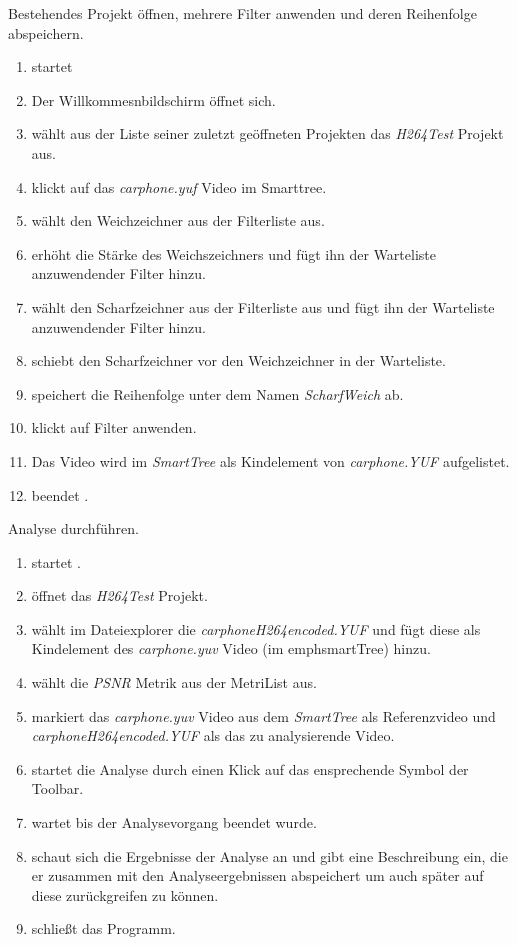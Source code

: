  Bestehendes Projekt öffnen, mehrere Filter anwenden und deren Reihenfolge abspeichern.\\ %
\begin{enumerate}
\item \dAU startet \projektTitel
\item Der Willkommesnbildschirm öffnet sich.
\item \dAU wählt aus der Liste seiner zuletzt geöffneten Projekten das \emph{H264Test} Projekt aus.
\item \dAU klickt auf das \emph{carphone.yuf} Video im Smarttree.
\item \dAU wählt den Weichzeichner aus der Filterliste aus.
\item \dAU erhöht die Stärke des Weichszeichners und fügt ihn der Warteliste anzuwendender Filter hinzu.
\item \dAU wählt den Scharfzeichner aus der Filterliste aus und fügt ihn der Warteliste anzuwendender Filter hinzu.
\item \dAU schiebt den Scharfzeichner vor den Weichzeichner in der Warteliste.
\item \dAU speichert die Reihenfolge unter dem Namen \emph{ScharfWeich} ab.
\item \dAU klickt auf Filter anwenden.
\item Das Video wird im \emph{SmartTree} als Kindelement von \emph{carphone.YUF} aufgelistet.
\item  \dAU beendet \projektTitel.
\end{enumerate}

 Analyse durchführen.
\begin{enumerate}
\item \dAU startet \projektTitel.
\item \dAU öffnet das \emph{H264Test} Projekt.
\item \dAU wählt im Dateiexplorer die \emph{carphoneH264encoded.YUF} und fügt diese als Kindelement des \emph{carphone.yuv} Video (im emph{smartTree}) hinzu.
\item \dAU wählt die \emph{PSNR} Metrik aus der MetriList aus.
\item \dAU markiert das \emph{carphone.yuv} Video aus dem \emph{SmartTree} als Referenzvideo und \emph{carphoneH264encoded.YUF} als das zu analysierende Video.
\item \dAU startet die Analyse durch einen Klick auf das ensprechende Symbol der Toolbar.
\item \dAU wartet bis der Analysevorgang beendet wurde.
\item \dAU schaut sich die Ergebnisse der Analyse an und gibt eine Beschreibung ein, die er zusammen mit den Analyseergebnissen abspeichert um auch später auf diese zurückgreifen zu können.
\item \dAU schließt das Programm.
\end{enumerate}

